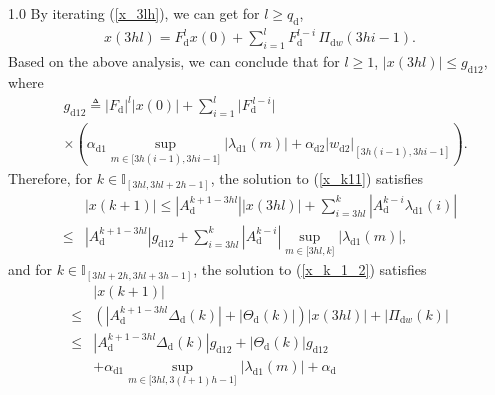\documentclass[journal]{IEEEtran}
\begin{document}
\begin{spacing}{1.0}
By iterating (\ref{x_3lh}),
we can get for $l\geq q_{\mathrm{d}}$,
\begin{align}
x\left(  3hl\right) =F_{\mathrm{d}}^{l}x\left(0\right)
+\sum_{i=1}^{l}F_{\mathrm{d}}^{l-i}\,\mathit{\Pi}_{\mathrm{d}w}\left(
3hi-1\right)  . \label{x_3hn}%
\end{align}
Based on the above analysis, we can conclude that for $l\geq1$, $\left\vert
x\left(  3hl\right)  \right\vert \leq g_{\mathrm{d}12}$, where
\begin{align*}
&  g_{\mathrm{d}12}\triangleq\vert F_{\mathrm{d}}\vert
^{l}\vert x(0)\vert +\sum_{i=1}^{l}\vert
F_{\mathrm{d}}^{\,l-i}\vert \\
&  \times\left(  \alpha_{\mathrm{d}1}\sup_{m\in\lbrack3h(i-1)
,3hi-1]}\vert \lambda_{\mathrm{d}1}(m)\vert +\alpha
_{\mathrm{d}2}\vert w_{\mathrm{d}2}\vert _{[3h(i-1),3hi-1]}\right)  .
\end{align*}
Therefore, for $k\in\mathbb{I}_{[3hl,3hl+2h-1]}$, the solution to
(\ref{x_k11}) satisfies
\begin{align*}
&  \left\vert x(k+1)\right\vert \leq\left\vert A_{\mathrm{d}}^{k+1-3hl}%
\right\vert \left\vert x\left(  3hl\right)  \right\vert +%
{\displaystyle\sum_{i=3hl}^{k}}
\left\vert A_{\mathrm{d}}^{k-i}\lambda_{\mathrm{d}1}(i)\right\vert \\
\leq  &  \left\vert A_{\mathrm{d}}^{k+1-3hl}\right\vert g_{\mathrm{d}12}+%
{\displaystyle\sum_{i=3hl}^{k}}
\left\vert A_{\mathrm{d}}^{k-i}\right\vert \sup_{m\in\lbrack3hl,k]}\left\vert
\lambda_{\mathrm{d}1}(m)\right\vert ,
\end{align*}
and for $k\in\mathbb{I}_{[3hl+2h,3hl+3h-1]}$, the solution to (\ref{x_k_1_2})
satisfies
\begin{align*}
&  |x(k+1)|\\
\leq &  \left(  \left\vert A_{\mathrm{d}}^{k+1-3hl}\mathit{\Delta}%
_{\mathrm{d}}\left(  k\right)  \right\vert +\left\vert \mathit{\Theta
}_{\mathrm{d}}(k)\right\vert \right)  \left\vert x\left(  3hl\right)
\right\vert +\left\vert \mathit{\Pi}_{\mathrm{d}w}\left(  k\right)
\right\vert \\
\leq &  \left\vert A_{\mathrm{d}}^{k+1-3hl}\mathit{\Delta}_{\mathrm{d}}\left(
k\right)  \right\vert g_{\mathrm{d}12}+\left\vert \mathit{\Theta}_{\mathrm{d}%
}(k)\right\vert g_{\mathrm{d}12}\\
&  +\alpha_{\mathrm{d}1}\sup_{m\in\lbrack3hl,3(l+1)h-1]}%
\left\vert \lambda_{\mathrm{d}1}(m)\right\vert +\alpha_{\mathrm{d}%
}
\end{align*}
\end{spacing}
\end{document}
